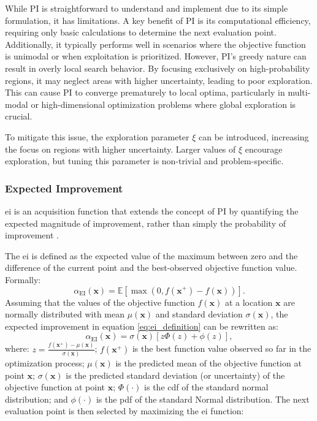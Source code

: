 While \ac{PI} is straightforward to understand and implement due to its simple formulation, it has limitations. A key benefit of PI is its computational efficiency, requiring only basic calculations to determine the next evaluation point. Additionally, it typically performs well in scenarios where the objective function is unimodal or when exploitation is prioritized. However, \ac{PI}'s greedy nature can result in overly local search behavior. By focusing exclusively on high-probability regions, it may neglect areas with higher uncertainty, leading to poor exploration. This can cause \ac{PI} to converge prematurely to local optima, particularly in multi-modal or high-dimensional optimization problems where global exploration is crucial.

To mitigate this issue, the exploration parameter \(\xi\) can be introduced, increasing the focus on regions with higher uncertainty. Larger values of \(\xi\) encourage exploration, but tuning this parameter is non-trivial and problem-specific. 

\subsubsection{Expected Improvement}
\label{section:ei}

\acf{ei} is an acquisition function that extends the concept of \ac{PI} by quantifying the expected magnitude of improvement, rather than simply the probability of improvement \citep{mockus1978application, jones1998efficient}. 

The \ac{ei} is defined as the expected value of the maximum between zero and the difference of the current point and the best-observed objective function value. Formally:
\begin{equation}
\alpha_{\text{EI}}(\mathbf{x}) = \mathbb{E} [\max(0, f(\mathbf{x}^+) - f(\mathbf{x}))].
\label{eq:ei_definition}
\end{equation}
Assuming that the values of the objective function \(f(\mathbf{x})\) at a location \(\mathbf{x}\) are normally distributed with mean \(\mu(\mathbf{x})\) and standard deviation \(\sigma(\mathbf{x})\), the expected improvement in equation \eqref{eq:ei_definition} can be rewritten as:
\begin{equation}
    \alpha_{\text{EI}}(\mathbf{x}) = \sigma(\mathbf{x}) [ z \Phi(z) + \phi(z) ],
    \label{eq:ei_formula}
\end{equation}
where: \(z =  \frac{f(\mathbf{x}^+) - \mu(\mathbf{x})}{\sigma(\mathbf{x})}\); \(f(\mathbf{x}^+)\) is the best function value observed so far in the optimization process; \(\mu(\mathbf{x})\) is the predicted mean of the objective function at point \(\mathbf{x}\); \(\sigma(\mathbf{x})\) is the predicted standard deviation (or uncertainty) of the objective function at point \(\mathbf{x}\); \(\Phi(\cdot)\) is the \ac{cdf} of the standard normal distribution; and \(\phi(\cdot)\) is the \ac{pdf} of the standard Normal distribution. The next evaluation point is then selected by maximizing the \ac{ei} function:

